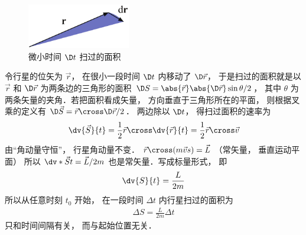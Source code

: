
\begin{figure}[ht]
\centering
\includegraphics[width=4.5cm]{./figures/Keple21.pdf}
\caption{微小时间 $\D t$ 扫过的面积} \label{Keple21}
\end{figure}

令行星的位矢为 $\vec r$，  在很小一段时间 $\D t$ 内移动了 $\D \vec r$，  于是扫过的面积就是以 $\vec r$ 和 $\D \vec r$ 为两条边的三角形的面积 $\D S = \abs{\vec r} \abs{\D \vec r} \sin \theta /2 $，  其中 $\theta $ 为两条矢量的夹角．若把面积看成矢量， 方向垂直于三角形所在的平面， 则根据叉乘的定义有 $\D \vec S = \vec r \cross \D \vec r/2$． 两边除以 $\D t$，  得扫过面积的速率为
\begin{equation}
\dv{\vec S}{t} = \frac{1}{2}\vec r \cross \dv{\vec r}{t} = \frac 12 \vec r\cross \vec v
\end{equation}
由“角动量守恒”， 行星角动量不变．
$\vec r \cross (m\vec vs) = \vec L$ （常矢量， 垂直运动平面） 所以 $\dv*{\vec S}{t} = \vec L /2m$ 也是常矢量．写成标量形式， 即
\begin{equation}
\dv{S}{t} = \frac{L}{{2m}}
\end{equation}
所以从任意时刻 $t_0$ 开始， 在一段时间 $\Delta t$ 内行星扫过的面积为 
\begin{equation}
\begin{aligned}
\Delta S = \frac{L}{{2m}}\Delta t
\end{aligned}
\end{equation}
只和时间间隔有关， 而与起始位置无关．

